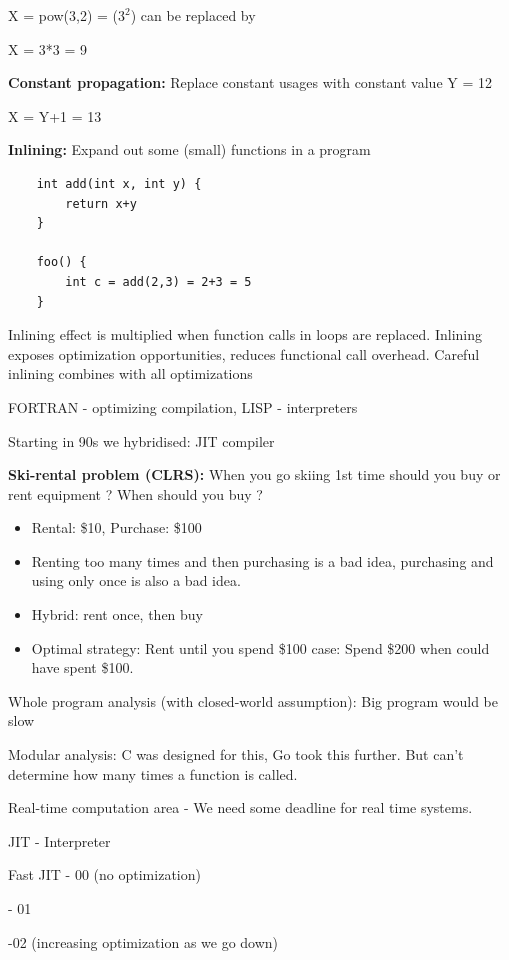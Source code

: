 \documentclass[twoside]{article}
\begin{document}
X = pow(3,2) = ($3^2$) can be replaced by

X = 3*3 = 9

\textbf{Constant propagation:} Replace constant usages with constant value
Y = 12

X = Y+1 = 13

\textbf{Inlining:} Expand out some (small) functions in a program

\begin{verbatim}
    int add(int x, int y) {
        return x+y
    }

    foo() {
        int c = add(2,3) = 2+3 = 5
    }    
\end{verbatim}


Inlining effect is multiplied when function calls in loops are replaced. Inlining exposes optimization opportunities, reduces functional call overhead. Careful inlining combines with all optimizations

FORTRAN - optimizing compilation, LISP - interpreters

Starting in 90s we hybridised: JIT compiler

\textbf{Ski-rental problem (CLRS):} When you go skiing 1st time should you buy or rent equipment ? When should you buy ?
\begin{itemize}
    \item Rental: \$10, Purchase: \$100
    \item Renting too many times and then purchasing is a bad idea, purchasing and using only once is also a bad idea.
    \item Hybrid: rent once, then buy
    \item Optimal strategy: Rent until you spend \$100
    \itemWorst case: Spend \$200 when could have spent \$100.
\end{itemize}

Whole program analysis (with closed-world assumption): Big program would be slow

Modular analysis: C was designed for this, Go took this further. But can't determine how many times a function is called.

Real-time computation area - We need some deadline for real time systems.

JIT - Interpreter

Fast JIT - 00 (no optimization)

\hspace{1cm}- 01
    
\hspace{1cm}-02 (increasing optimization as we go down)
    
\end{document}

